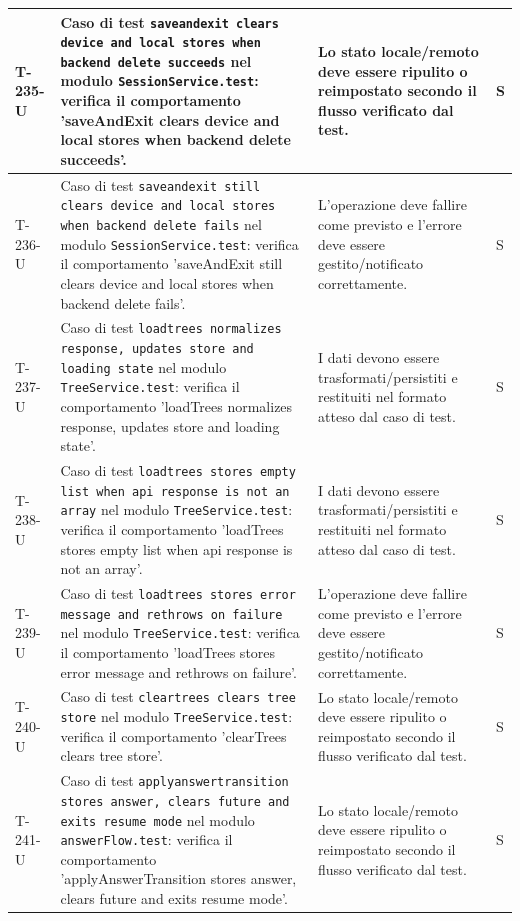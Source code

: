 \documentclass[a4paper,12pt]{article}
\begin{document}
{{\begin{longtable}{|>{\RaggedRight\arraybackslash}p{1.55cm}|>{\RaggedRight\arraybackslash}p{8.0cm}|>{\RaggedRight\arraybackslash}p{4.6cm}|>{\RaggedRight\arraybackslash}p{1.2cm}|}
        \hline
        T-235-U & Caso di test \texttt{saveandexit clears device and local stores when backend delete succeeds} nel modulo \texttt{SessionService.test}: verifica il comportamento 'saveAndExit clears device and local stores when backend delete succeeds'. & Lo stato locale/remoto deve essere ripulito o reimpostato secondo il flusso verificato dal test. & S \\
        \hline
        T-236-U & Caso di test \texttt{saveandexit still clears device and local stores when backend delete fails} nel modulo \texttt{SessionService.test}: verifica il comportamento 'saveAndExit still clears device and local stores when backend delete fails'. & L'operazione deve fallire come previsto e l'errore deve essere gestito/notificato correttamente. & S \\
        \hline
        T-237-U & Caso di test \texttt{loadtrees normalizes response, updates store and loading state} nel modulo \texttt{TreeService.test}: verifica il comportamento 'loadTrees normalizes response, updates store and loading state'. & I dati devono essere trasformati/persistiti e restituiti nel formato atteso dal caso di test. & S \\
        \hline
        T-238-U & Caso di test \texttt{loadtrees stores empty list when api response is not an array} nel modulo \texttt{TreeService.test}: verifica il comportamento 'loadTrees stores empty list when api response is not an array'. & I dati devono essere trasformati/persistiti e restituiti nel formato atteso dal caso di test. & S \\
        \hline
        T-239-U & Caso di test \texttt{loadtrees stores error message and rethrows on failure} nel modulo \texttt{TreeService.test}: verifica il comportamento 'loadTrees stores error message and rethrows on failure'. & L'operazione deve fallire come previsto e l'errore deve essere gestito/notificato correttamente. & S \\
        \hline
        T-240-U & Caso di test \texttt{cleartrees clears tree store} nel modulo \texttt{TreeService.test}: verifica il comportamento 'clearTrees clears tree store'. & Lo stato locale/remoto deve essere ripulito o reimpostato secondo il flusso verificato dal test. & S \\
        \hline
        T-241-U & Caso di test \texttt{applyanswertransition stores answer, clears future and exits resume mode} nel modulo \texttt{answerFlow.test}: verifica il comportamento 'applyAnswerTransition stores answer, clears future and exits resume mode'. & Lo stato locale/remoto deve essere ripulito o reimpostato secondo il flusso verificato dal test. & S \\

\end{longtable}}}
\end{document}

